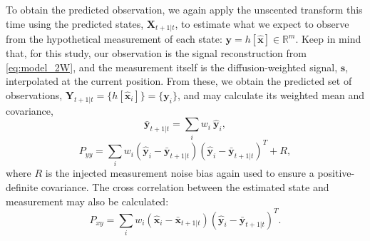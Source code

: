 \documentclass[letterpaper,hyperref,12pt]{gatech-thesis}
\renewcommand{\v}[1]{\ensuremath{\mathbf #1}\xspace}
\newcommand{\R}{\ensuremath{\mathbb R}}
\newcommand{\s}{\v s}
\newcommand{\x}{\v x}
\newcommand{\y}{\v y}
\newcommand{\X}{\v X}
\newcommand{\Y}{\v Y}
\begin{document}
To obtain the predicted observation, we again apply the unscented transform
this time using the predicted states, $\X_{t+1|t}$, to estimate what we expect
to observe from the hypothetical measurement of each state:
$\y=h[\hat{\x}] \in \R^m$.  Keep in mind that, for this study, our
observation is the signal reconstruction from \autoref{eq:model_2W}, and the
measurement itself is the diffusion-weighted signal, $\s$, interpolated at the
current position.  From these, we obtain the predicted set of observations,
$\Y_{t+1|t} = \{ h[\hat{\x}_i] \} = \{ \y_i \}$, and may calculate its
weighted mean and covariance,
\begin{equation*}
  \bar{\y}_{t+1|t} = \sum_i w_i ~ \hat{\y}_i ,
\end{equation*}
\begin{equation} \label{eq:Pyy}
  P_{yy} = \sum_i w_i \left(\hat{\y}_i - \bar{\y}_{t+1|t}\right)
                     \left(\hat{\y}_i - \bar{\y}_{t+1|t}\right)^T
           + R ,
\end{equation}
where $R$ is the injected measurement noise bias again used to ensure a
positive-definite covariance.  The cross correlation between the estimated
state and measurement may also be calculated:
\begin{equation} \label{eq:Pxy}
  P_{xy} = \sum_i w_i \left(\hat{\x}_i - \bar{\x}_{t+1|t}\right)
                     \left(\hat{\y}_i - \bar{\y}_{t+1|t}\right)^T .
\end{equation}
\end{document}
